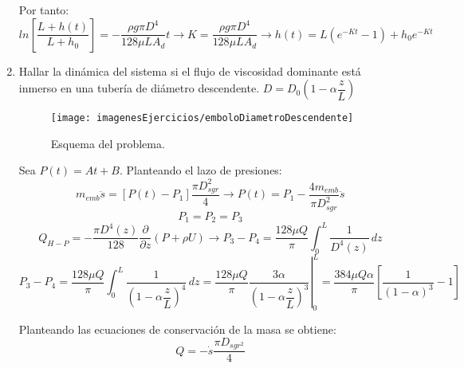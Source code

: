\begin{enumerate}
	
	Por tanto:
	\[ ln\left[\dfrac{L+h(t)}{L+h_0}\right]=-\dfrac{\rho g\pi D^4}{128 \mu L A_d }t \rightarrow K= \dfrac{\rho g\pi D^4}{128 \mu L A_d } \rightarrow h(t)=L\left(e^{-Kt}-1\right) + h_0e^{-Kt}\]
	\newpage
	\black
	\item Hallar la dinámica del sistema si el flujo de viscosidad dominante está inmerso en una tubería de diámetro descendente. $D=D_0\left(1-\alpha\dfrac{z}{L}\right)$
	\begin{figure}[H]
		\centering
		\texttt{[image: imagenesEjercicios/emboloDiametroDescendente]}
		\caption{Esquema del problema.}
		\label{fig:embolodiametrodescendente}
	\end{figure}
	\blue
	Sea $P(t)=At+B$. Planteando el lazo de presiones:
	\[m_{emb}\ddot{s}=\left[P(t)-P_1\right]\dfrac{\pi D_{sgr}^2}{4} \rightarrow P(t)=P_1 -\dfrac{4m_{emb}}{\pi D_{sgr}^2}\ddot{s}\]
	\[P_1=P_2=P_3\]
	\[Q_{H-P}=-\dfrac{\pi D^4(z)}{128}\dfrac{\partial}{\partial z}\left(P+\rho U\right) \rightarrow P_3-P_4 =\dfrac{128\mu Q}{\pi}\int_0^L \dfrac{1}{D^4(z)}\,dz\]
	\[P_3-P_4 =\dfrac{128\mu Q}{\pi}\int_0^L \dfrac{1}{\left(1-\alpha\dfrac{z}{L}\right)^4}\,dz=
	\left.\dfrac{128\mu Q}{\pi} \dfrac{3\alpha}{\left(1-\alpha\dfrac{z}{L}\right)^3}  \right|_0^L
	= \dfrac{384\mu Q \alpha}{\pi} \left[\dfrac{1}{\left(1-\alpha\right)^3 }- 1\right]
	\]
	
	
	Planteando las ecuaciones de conservación de la masa se obtiene:
	\[Q=-\dot{s}\dfrac{\pi D_{sgr^2}}{4}\]
	\black 
\end{enumerate}
\newpage
\black
